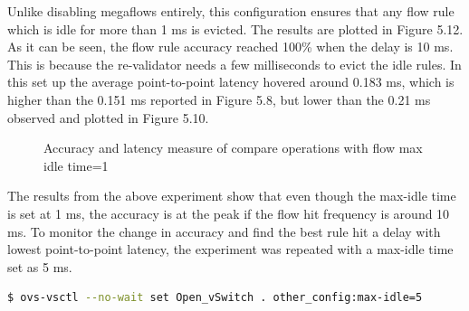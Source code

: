 Unlike disabling megaflows entirely, this configuration ensures that any flow rule which is idle for more than 1 ms is evicted. The results are plotted in Figure 5.12. As it can be seen, the flow rule accuracy reached 100\% when the delay is 10 ms. This is because the re-validator needs a few milliseconds to evict the idle rules. In this set up the average point-to-point latency hovered around 0.183 ms, which is higher than the 0.151 ms reported in Figure 5.8, but lower than the 0.21 ms observed and plotted in Figure 5.10.


\begin{figure}[H]  
 
 \caption{Accuracy and latency measure of compare operations with flow max idle time=1}
 \hfil{}
\end{figure}

 The results from the above experiment show that even though the max-idle time is set at 1 ms, the accuracy is at the peak if the flow hit frequency is around 10 ms. To monitor the change in accuracy and find the best rule hit a delay with lowest point-to-point latency, the experiment was repeated with a max-idle time set as 5 ms.

 \begin{lstlisting}[language=bash]
$ ovs-vsctl --no-wait set Open_vSwitch . other_config:max-idle=5 \end{lstlisting}

